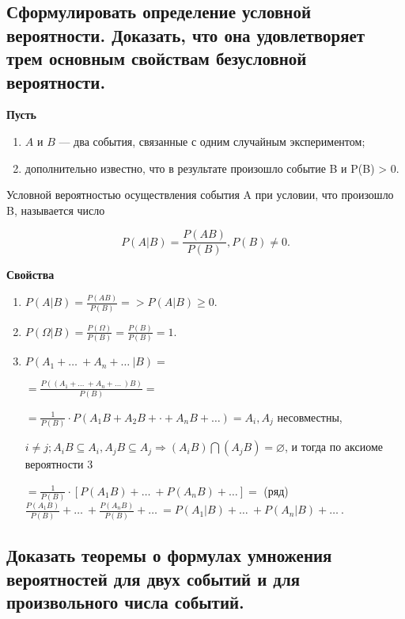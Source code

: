 \subsection{Сформулировать определение условной вероятности. Доказать, что она удовлетворяет трем основным свойствам безусловной вероятности.}

\textbf{Пусть} 

\begin{enumerate}
	\item $A$ и $B$ --- два события, связанные с одним случайным экспериментом;
	\item дополнительно известно, что в результате произошло событие B и P(B) > 0.
\end{enumerate}

Условной вероятностью осуществления события A при условии, что произошло B, называется число

\begin{equation}
	P(A|B) = \frac{P(AB)}{P(B)}, P(B) \neq 0.
\end{equation}

\textbf{Свойства}

\begin{enumerate}
	
	\item $P(A|B) = \frac{P(AB)}{P(B)} => P(A|B) \geqslant 0.$
	
	\item $P(\Omega|B) = \frac{P(\Omega)}{P(B)} = \frac{P(B)}{P(B)} = 1.$
	
	\item $P(A_1 + \dots\ + A_n + \dots\ | B) =$ 
	
	$ = \frac{P((A_1 + \dots\ + A_n + \dots\ )B)}{P(B)} = $
	
	$= \frac{1}{P(B)} \cdot P(A_1 B + A_2 B + \cdot + A_n B + \dots) = A_i, A_j$ несовместны, 
	
	$i \neq j; A_i B \subseteq A_i, A_j B \subseteq A_j \Rightarrow (A_i B) \bigcap (A_j B) = \varnothing$, и тогда по аксиоме вероятности 3 
	
	$= \frac{1}{P(B)} \cdot [P(A_1 B) + \dots\ + P(A_n B) + \dots] = $ (ряд) $\frac{P(A_1 B)}{P(B)} + \dots\ + \frac{P(A_n B)}{P(B)} + \dots\ = P(A_1 | B) + \dots\ + P(A_n | B) + \dots\ $.
	
	

\end{enumerate}

\subsection{Доказать теоремы о формулах умножения вероятностей для двух событий и для произвольного числа событий.}


